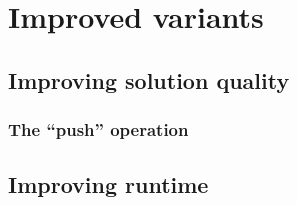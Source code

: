 \section{Improved variants}
\subsection{Improving solution quality}
\subsubsection{The \enquote{push} operation}

\subsection{Improving runtime}

